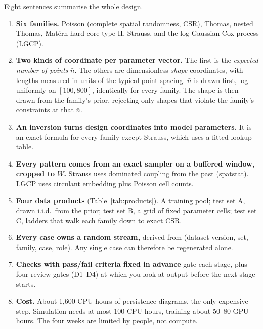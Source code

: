 \documentclass[10pt,a4paper]{article}
\newcommand{\nbar}{\bar n}
\begin{document}
Eight sentences summarise the whole design.
\begin{enumerate}
  \item \textbf{Six families.} Poisson (complete spatial randomness, CSR), Thomas, nested Thomas, Mat\'ern hard-core type II, Strauss, and the log-Gaussian Cox process (LGCP).
  \item \textbf{Two kinds of coordinate per parameter vector.} The first is the \emph{expected number of points} $\nbar$. The others are dimensionless \emph{shape} coordinates, with lengths measured in units of the typical point spacing. $\nbar$ is drawn first, log-uniformly on $[100,800]$, identically for every family. The shape is then drawn from the family's prior, rejecting only shapes that violate the family's constraints at that $\nbar$.
  \item \textbf{An inversion turns design coordinates into model parameters.} It is an exact formula for every family except Strauss, which uses a fitted lookup table.
  \item \textbf{Every pattern comes from an exact sampler on a buffered window, cropped to $W$.} Strauss uses dominated coupling from the past (spatstat). LGCP uses circulant embedding plus Poisson cell counts.
  \item \textbf{Four data products} (Table~\ref{tab:products}). A training pool; test set A, drawn i.i.d.\ from the prior; test set B, a grid of fixed parameter cells; test set C, ladders that walk each family down to exact CSR.
  \item \textbf{Every case owns a random stream,} derived from (dataset version, set, family, case, role). Any single case can therefore be regenerated alone.
  \item \textbf{Checks with pass/fail criteria fixed in advance} gate each stage, plus four review gates (D1--D4) at which you look at output before the next stage starts.
  \item \textbf{Cost.} About 1{,}600 CPU-hours of persistence diagrams, the only expensive step. Simulation needs at most 100 CPU-hours, training about 50--80 GPU-hours. The four weeks are limited by people, not compute.
\end{enumerate}
\end{document}
